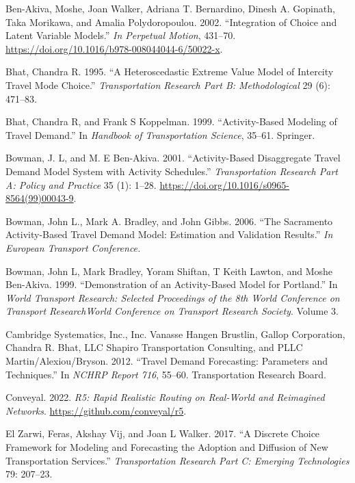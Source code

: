 \documentclass[12pt, oneside, openright]{byuthesis}
\newlength{\cslhangindent}
\newlength{\cslentryspacingunit} %
\newenvironment{CSLReferences}[2] %
 {%
  \setlength{\parindent}{0pt}
  \ifodd #1
  \let\oldpar\par
  \def\par{\hangindent=\cslhangindent\oldpar}
  \fi
  \setlength{\parskip}{#2\cslentryspacingunit}
 }%
 {}
\begin{document}
\begin{CSLReferences}{1}{0}
\leavevmode{}%
Ben-Akiva, Moshe, Joan Walker, Adriana T. Bernardino, Dinesh A. Gopinath, Taka Morikawa, and Amalia Polydoropoulou. 2002. {``Integration of Choice and Latent Variable Models.''} \emph{In Perpetual Motion}, 431--70. \url{https://doi.org/10.1016/b978-008044044-6/50022-x}.

\leavevmode{}%
Bhat, Chandra R. 1995. {``A Heteroscedastic Extreme Value Model of Intercity Travel Mode Choice.''} \emph{Transportation Research Part B: Methodological} 29 (6): 471--83.

\leavevmode{}%
Bhat, Chandra R, and Frank S Koppelman. 1999. {``Activity-Based Modeling of Travel Demand.''} In \emph{Handbook of Transportation Science}, 35--61. Springer.

\leavevmode{}%
Bowman, J. L, and M. E Ben-Akiva. 2001. {``Activity-Based Disaggregate Travel Demand Model System with Activity Schedules.''} \emph{Transportation Research Part A: Policy and Practice} 35 (1): 1--28. \url{https://doi.org/10.1016/s0965-8564(99)00043-9}.

\leavevmode{}%
Bowman, John L., Mark A. Bradley, and John Gibbs. 2006. {``The Sacramento Activity-Based Travel Demand Model: Estimation and Validation Results.''} \emph{In European Transport Conference.}

\leavevmode{}%
Bowman, John L, Mark Bradley, Yoram Shiftan, T Keith Lawton, and Moshe Ben-Akiva. 1999. {``Demonstration of an Activity-Based Model for Portland.''} In \emph{World Transport Research: Selected Proceedings of the 8th World Conference on Transport ResearchWorld Conference on Transport Research Society}. Volume 3.

\leavevmode{}%
Cambridge Systematics, Inc., Inc. Vanasse Hangen Brustlin, Gallop Corporation, Chandra R. Bhat, LLC Shapiro Transportation Consulting, and PLLC Martin/Alexiou/Bryson. 2012. {``Travel Demand Forecasting: Parameters and Techniques.''} In \emph{NCHRP Report 716}, 55--60. Transportation Research Board.

\leavevmode{}%
Conveyal. 2022. \emph{R5: Rapid Realistic Routing on Real-World and Reimagined Networks}. \url{https://github.com/conveyal/r5}.

\leavevmode{}%
El Zarwi, Feras, Akshay Vij, and Joan L Walker. 2017. {``A Discrete Choice Framework for Modeling and Forecasting the Adoption and Diffusion of New Transportation Services.''} \emph{Transportation Research Part C: Emerging Technologies} 79: 207--23.


\end{CSLReferences}
\end{document}
